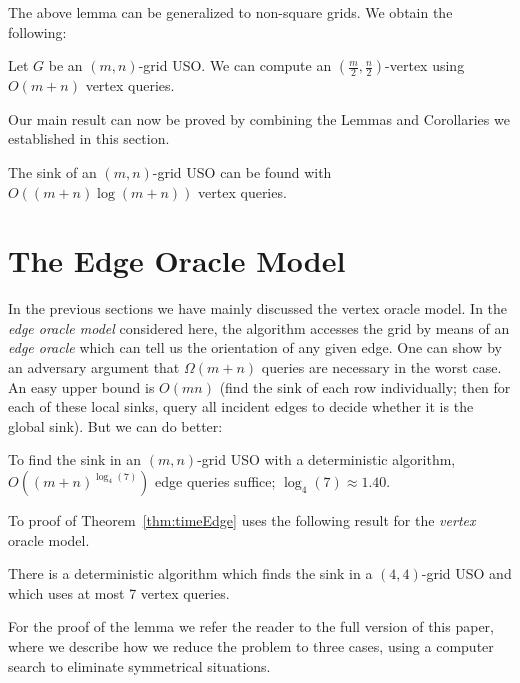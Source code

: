 \documentclass[runningheads,a4paper]{llncs}
\newcommand{\MM}[1]{\marginpar{\parbox{3.6cm}{{\small {\bf MM:} #1}}}} %
\begin{document}
The above lemma can be generalized to non-square grids. We obtain the \mbox{following:}
\begin{corollary}\label{corollary: (m/2,n/2) indegree}
Let $G$ be an $(m,n)$-grid USO. 
We can compute an $( \frac{m}{2}, \frac{n}{2})$-vertex using $O(m + n)$ vertex queries.
\end{corollary}

Our main result can now be proved by combining the Lemmas and Corollaries we established in this section. 

\begin{theorem}\label{theorem:Sink algorithm}
The sink of an $(m,n)$-grid USO can be found with \\ $O((m+n)\log (m+n))$ vertex queries.
\end{theorem}

\section{The Edge Oracle Model}
\label{section:The edge oracle model}

In the previous sections we have mainly discussed the vertex oracle model.
In the \emph{edge oracle model} considered here, the algorithm accesses the
grid by means of an \emph{edge oracle} which can tell us
the orientation of any given edge.
One can show by an adversary argument that $\Omega(m+n)$ queries are necessary in the worst case.
An easy upper bound is $O(mn)$ (find the sink of each row individually; then
for each of these local sinks, query all incident edges to decide whether it
is the global sink).
But we can do better:

\begin{theorem}
    \label{thm:timeEdge}
    To find the sink in an $(m,n)$-grid USO with a deterministic algorithm,
    $O((m+n) ^ {\log_4(7)})$ edge queries suffice; $\log_4(7) \approx
    1.40$.
\end{theorem}

To proof of Theorem~\ref{thm:timeEdge} uses the following result for the \emph{vertex} oracle model.

\begin{lemma}
    \label{lem:4:7}
    There is a deterministic algorithm which finds the sink in a
    $(4,4)$-grid USO and which uses at most 7 vertex queries.
\end{lemma}

\MM{Improve this sentence}
For the proof of the lemma we refer the reader to the full version of this paper, where we describe how we reduce the problem to three cases, using a computer search to eliminate symmetrical situations. 
\end{document}
